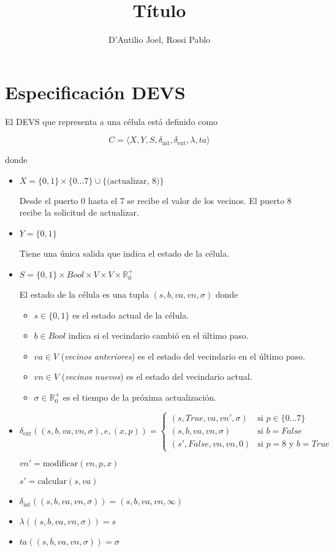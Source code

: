 \documentclass[12pt]{article}
\title{Título}
\author{D'Autilio Joel, Rossi Pablo}
\date{}
\newcommand{\dint}{\delta_{\text{int}}}
\newcommand{\dext}{\delta_{\text{ext}}}
\begin{document}
\maketitle

\section{Especificación DEVS}

El DEVS que representa a una célula está definido como

\[ C = \langle X, Y, S, \dint, \dext, \lambda, ta \rangle \]

donde
\begin{itemize}
  \item $X = \{0,1\} \times \{0 \dots 7\} \cup \{\text{(actualizar, 8)}\}$

    Desde el puerto 0 hasta el 7 se recibe el valor de los vecinos. El puerto 8 recibe la solicitud de actualizar.

  \item $Y = \{0,1\}$

    Tiene una única salida que indica el estado de la célula.

  \item $S = \{0,1\} \times Bool \times V \times V \times \mathbb{R}_0^+$

    El estado de la célula es una tupla $(s, b, va, vn, \sigma)$ donde
    \begin{itemize}
      \item $s \in \{0,1\}$ es el estado actual de la célula.
      \item $b \in Bool$ indica si el vecindario cambió en el último paso.
      \item $va \in V$ (\textit{vecinos anteriores}) es el estado del vecindario en el último paso.
      \item $vn \in V$ (\textit{vecinos nuevos}) es el estado del vecindario actual.
      \item $\sigma \in \mathbb{R}_0^+$ es el tiempo de la próxima actualización.
    \end{itemize}

  \item $\dext((s, b, va, vn, \sigma), e, (x,p)) = \begin{cases}
    (s, True, va, vn', \sigma) & \text{si } p \in \{0\dots 7\} \\
    (s, b, va, vn, \sigma)     & \text{si } b = False \\
    (s', False, vn, vn, 0) & \text{si } p = 8 \text{ y } b = True
    \end{cases}$

    $vn' = \text{modificar}(vn, p, x)$

    $s' = \text{calcular}(s, va)$

  \item $\dint((s, b, va, vn, \sigma)) = (s, b, va, vn, \infty)$

  \item $\lambda((s, b, va, vn, \sigma)) = s$

  \item $ta((s, b, va, vn, \sigma)) = \sigma$
\end{itemize}
\end{document}
